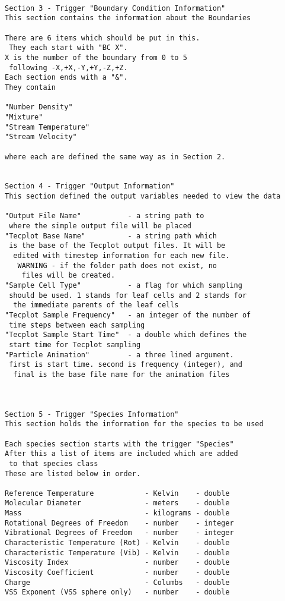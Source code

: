 \begin{verbatim}
  
Section 3 - Trigger "Boundary Condition Information"  
This section contains the information about the Boundaries  
  
There are 6 items which should be put in this. 
 They each start with "BC X".   
X is the number of the boundary from 0 to 5
 following -X,+X,-Y,+Y,-Z,+Z.   
Each section ends with a "&".   
They contain  
  
"Number Density"  
"Mixture"  
"Stream Temperature"  
"Stream Velocity"  
  
where each are defined the same way as in Section 2.  
  
  
Section 4 - Trigger "Output Information"  
This section defined the output variables needed to view the data  
  
"Output File Name"           - a string path to
 where the simple output file will be placed  
"Tecplot Base Name"          - a string path which
 is the base of the Tecplot output files. It will be
  edited with timestep information for each new file.
   WARNING - if the folder path does not exist, no
    files will be created.  
"Sample Cell Type"           - a flag for which sampling 
 should be used. 1 stands for leaf cells and 2 stands for 
  the immediate parents of the leaf cells  
"Tecplot Sample Frequency"   - an integer of the number of
 time steps between each sampling  
"Tecplot Sample Start Time"  - a double which defines the
 start time for Tecplot sampling  
"Particle Animation"         - a three lined argument.
 first is start time. second is frequency (integer), and
  final is the base file name for the animation files  
  
  
  
Section 5 - Trigger "Species Information"  
This section holds the information for the species to be used  
  
Each species section starts with the trigger "Species"  
After this a list of items are included which are added
 to that species class  
These are listed below in order.   
  
Reference Temperature            - Kelvin    - double  
Molecular Diameter               - meters    - double  
Mass                             - kilograms - double  
Rotational Degrees of Freedom    - number    - integer  
Vibrational Degrees of Freedom   - number    - integer  
Characteristic Temperature (Rot) - Kelvin    - double  
Characteristic Temperature (Vib) - Kelvin    - double  
Viscosity Index                  - number    - double  
Viscosity Coefficient            - number    - double  
Charge                           - Columbs   - double  
VSS Exponent (VSS sphere only)   - number    - double    
  

\end{verbatim}
